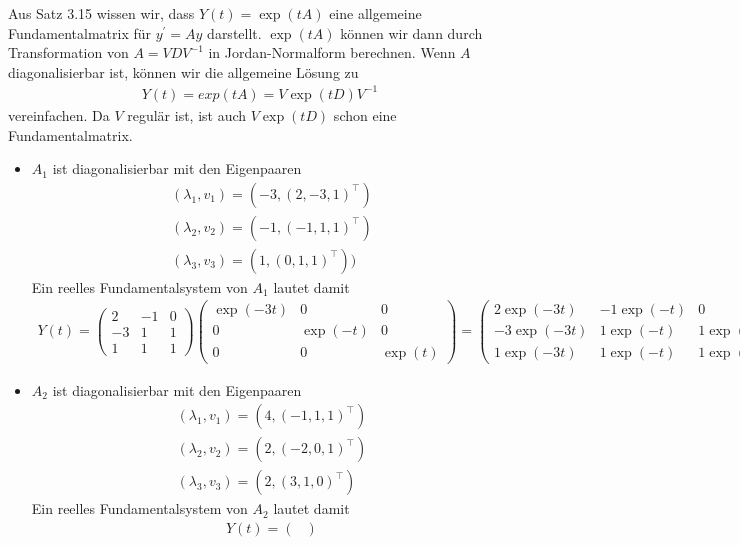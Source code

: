 \begin{solution}
Aus Satz 3.15 wissen wir, dass $Y(t) = \exp(tA)$ eine allgemeine Fundamentalmatrix für $y^{\prime} = Ay$
darstellt. $\exp(tA)$ können wir dann durch Transformation von $A = VDV^{-1}$ in Jordan-Normalform berechnen.
Wenn $A$ diagonalisierbar ist, können wir die allgemeine Lösung zu
\begin{align*}
  Y(t) = exp(tA) = V\exp(tD)V^{-1}
\end{align*}
vereinfachen. Da $V$ regulär ist, ist auch $V\exp(tD)$ schon eine Fundamentalmatrix.
\begin{itemize}
  \item $A_1$ ist diagonalisierbar mit den Eigenpaaren
  \begin{align*}
  (\lambda_1,v_1) = (-3,(2,-3,1)^{\top})\\
  (\lambda_2,v_2) = (-1,(-1,1,1)^{\top}) \\
  (\lambda_3,v_3) = (1,(0,1,1)^{\top}))
  \end{align*}
  Ein reelles Fundamentalsystem von $A_1$ lautet damit
  \begin{align*}
    Y(t) = \begin{pmatrix}
      2 & -1 & 0 \\ -3 & 1 & 1 \\ 1 & 1 & 1
    \end{pmatrix}
    \begin{pmatrix}
      \exp(-3t) & 0 & 0 \\
      0 & \exp(-t) & 0 \\
      0 & 0 & \exp(t)
    \end{pmatrix} =
    \begin{pmatrix}
      2\exp(-3t) & -1\exp(-t) & 0 \\
      -3\exp(-3t) & 1\exp(-t) & 1\exp(t) \\
      1\exp(-3t) & 1\exp(-t) & 1\exp(t)
    \end{pmatrix}.
  \end{align*}
  \item $A_2$ ist diagonalisierbar mit den Eigenpaaren
  \begin{align*}
  (\lambda_1,v_1) = (4,(-1,1,1)^{\top}) \\
  (\lambda_2,v_2) = (2,(-2,0,1)^{\top}) \\
  (\lambda_3,v_3) = (2,(3,1,0)^{\top})
  \end{align*}
  Ein reelles Fundamentalsystem von $A_2$ lautet damit
  \begin{align*}
    Y(t) = \begin{pmatrix}

\end{pmatrix}
\end{align*}
\end{itemize}
\end{solution}
